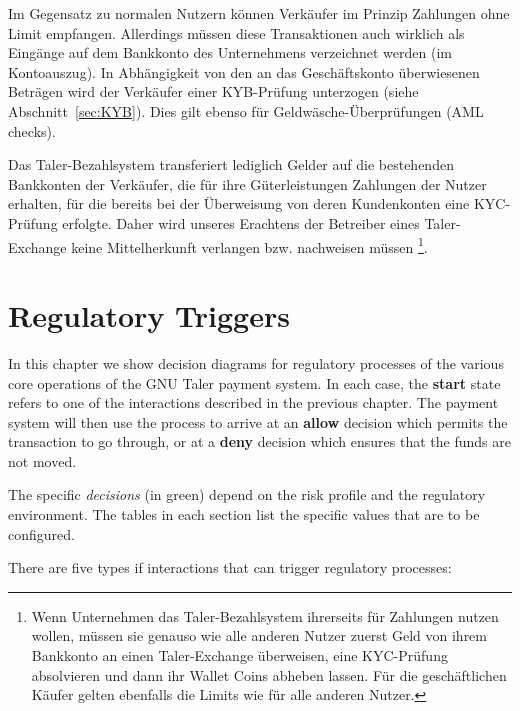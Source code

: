 \documentclass[10pt,a4paper,oneside]{book}
\begin{document}
Im Gegensatz zu normalen Nutzern k\"onnen Verk\"aufer im Prinzip
Zahlungen ohne Limit empfangen. Allerdings m\"ussen diese Transaktionen
auch wirklich als Eing\"ange auf dem Bankkonto des Unternehmens verzeichnet
werden (im Kontoauszug). In Abh\"angigkeit von den an das Gesch\"aftskonto
\"uberwiesenen Betr\"agen wird der Verk\"aufer einer KYB-Pr\"ufung unterzogen
(siehe Abschnitt~\ref{sec:KYB}). Dies gilt ebenso f\"ur
Geldw\"asche-\"Uberpr\"ufungen (AML checks).

Das Taler-Bezahlsystem transferiert lediglich Gelder auf die bestehenden
Bankkonten der Verk\"aufer, die f\"ur ihre G\"uterleistungen Zahlungen
der Nutzer erhalten, f\"ur die bereits bei der \"Uberweisung von deren
Kundenkonten eine KYC-Pr\"ufung erfolgte. Daher wird unseres Erachtens
der Betreiber eines Taler-Exchange keine Mittelherkunft verlangen bzw. 
nachweisen m\"ussen
\footnote{Wenn Unternehmen das Taler-Bezahlsystem ihrerseits f\"ur 
Zahlungen nutzen wollen, m\"ussen sie genauso wie alle anderen Nutzer 
zuerst Geld von ihrem Bankkonto an einen Taler-Exchange \"uberweisen, 
eine KYC-Pr\"ufung absolvieren und dann ihr Wallet Coins abheben lassen.
F\"ur die gesch\"aftlichen K\"aufer gelten ebenfalls die Limits wie 
f\"ur alle anderen Nutzer.}.












\chapter{Regulatory Triggers} \label{chap:triggers}

In this chapter we show decision diagrams for regulatory processes of the
various core operations of the GNU Taler payment system.  In each case, the
{\bf start} state refers to one of the interactions described in the previous
chapter.  The payment system will then use the process to arrive at an {\bf
  allow} decision which permits the transaction to go through, or at a {\bf
  deny} decision which ensures that the funds are not moved.

The specific {\em decisions} (in green) depend on the risk profile and the
regulatory environment. The tables in each section list the specific values
that are to be configured.

There are five types if interactions that can trigger regulatory processes:
\end{document}
